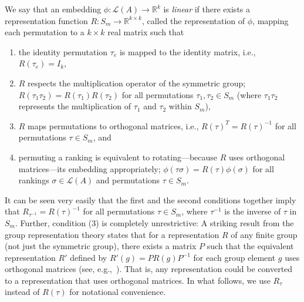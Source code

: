 \documentclass[prodmode,acmec]{ec-acmsmall}
\newcommand{\calL}{{\mathcal{L}}}
\newcommand{\rank}{{\calL(A)}}
\begin{document}
\begin{definition}
We say that an embedding $\phi:\rank \rightarrow \mathbb{R}^k$ is \emph{linear} if there exists a representation function $R : S_m \rightarrow \mathbb{R}^{k \times k}$, called the representation of $\phi$, mapping each permutation to a $k \times k$ real matrix such that 
\begin{enumerate}
\item the identity permutation $\tau_e$ is mapped to the identity matrix, i.e., $R(\tau_e) = I_k$,
\item $R$ respects the multiplication operator of the symmetric group; $R(\tau_1 \tau_2) = R(\tau_1) R(\tau_2)$ for all permutations $\tau_1,\tau_2 \in S_m$ (where $\tau_1 \tau_2$ represents the multiplication of $\tau_1$ and $\tau_2$ within $S_m$), 
\item $R$ maps permutations to orthogonal matrices, i.e., $R(\tau)^T = R(\tau)^{-1}$ for all permutations $\tau \in S_m$, and
\item permuting a ranking is equivalent to rotating---because $R$ uses orthogonal matrices---its embedding appropriately; $\phi(\tau \sigma) = R(\tau) \phi(\sigma)$ for all rankings $\sigma \in \rank$ and permutations $\tau \in S_m$.
\end{enumerate}
\end{definition}

It can be seen very easily that the first and the second conditions together imply that $R_{\tau^{-1}} = R(\tau)^{-1}$ for all permutations $\tau \in S_m$, where $\tau^{-1}$ is the inverse of $\tau$ in $S_m$. Further, condition (3) is completely unrestrictive: A striking result from the group representation theory states that for a representation $R$ of any finite group (not just the symmetric group), there exists a matrix $P$ such that the equivalent representation $R'$ defined by $R'(g) = P R(g) P^{-1}$ for each group element $g$ uses orthogonal matrices (see, e.g.,~\cite[Theorem~6.3]{BMWM63}). That is, any representation could be converted to a representation that uses orthogonal matrices. In what follows, we use $R_{\tau}$ instead of $R(\tau)$ for notational convenience. 
\end{document}
